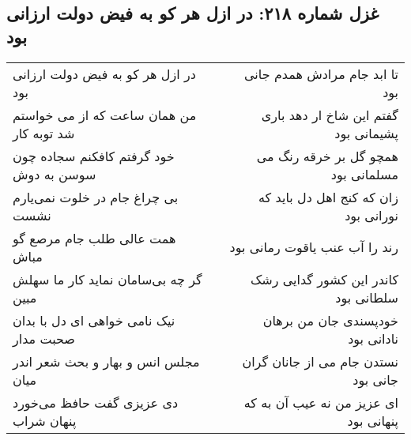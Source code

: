 \begin{center}
\section*{غزل شماره ۲۱۸: در ازل هر کو به فیض دولت ارزانی بود}
\label{sec:sh218}
\begin{longtable}{l p{0.5cm} r}
در ازل هر کو به فیض دولت ارزانی بود
&&
تا ابد جام مرادش همدم جانی بود
\\
من همان ساعت که از می خواستم شد توبه کار
&&
گفتم این شاخ ار دهد باری پشیمانی بود
\\
خود گرفتم کافکنم سجاده چون سوسن به دوش
&&
همچو گل بر خرقه رنگ می مسلمانی بود
\\
بی چراغ جام در خلوت نمی‌یارم نشست
&&
زان که کنج اهل دل باید که نورانی بود
\\
همت عالی طلب جام مرصع گو مباش
&&
رند را آب عنب یاقوت رمانی بود
\\
گر چه بی‌سامان نماید کار ما سهلش مبین
&&
کاندر این کشور گدایی رشک سلطانی بود
\\
نیک نامی خواهی ای دل با بدان صحبت مدار
&&
خودپسندی جان من برهان نادانی بود
\\
مجلس انس و بهار و بحث شعر اندر میان
&&
نستدن جام می از جانان گران جانی بود
\\
دی عزیزی گفت حافظ می‌خورد پنهان شراب
&&
ای عزیز من نه عیب آن به که پنهانی بود
\\
\end{longtable}
\end{center}
